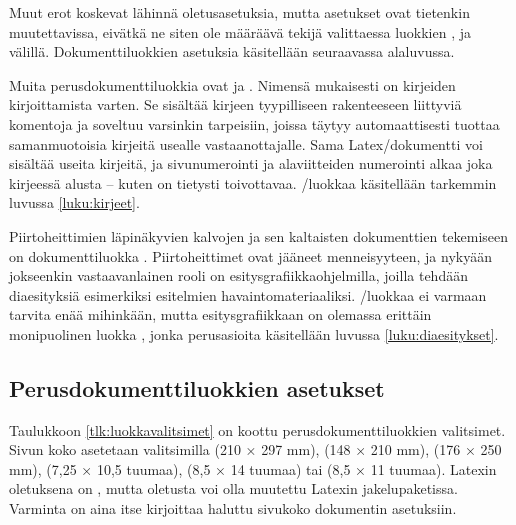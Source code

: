 Muut erot koskevat lähinnä oletusasetuksia, mutta asetukset ovat
tietenkin muutettavissa, eivätkä ne siten ole määräävä tekijä
valittaessa luokkien ,  ja
 välillä. Dokumenttiluokkien asetuksia käsitellään
seuraavassa alaluvussa.

Muita perusdokumenttiluokkia ovat  
ja . Nimensä mukaisesti  on kirjeiden
kirjoittamista varten. Se sisältää kirjeen tyypilliseen rakenteeseen
liittyviä komentoja ja soveltuu varsinkin tarpeisiin, joissa täytyy
automaattisesti tuottaa samanmuotoisia kirjeitä usealle
vas\-taan\-otta\-jalle. Sama Latex\-/dokumentti voi sisältää useita
kirjeitä, ja sivunumerointi ja alaviitteiden numerointi alkaa joka
kirjeessä alusta -- kuten on tietysti toivottavaa.
\-/luokkaa käsitellään tarkemmin luvussa
\ref{luku:kirjeet}.

Piirtoheittimien läpinäkyvien kalvojen ja sen kaltaisten dokumenttien
tekemiseen on dokumenttiluokka . 
Piirtoheittimet ovat jääneet menneisyyteen, ja nykyään jokseenkin
vastaavanlainen rooli on esi\-tys\-gra\-fiikka\-ohjel\-milla, joilla
tehdään dia\-esi\-tyk\-siä esimerkiksi esitelmien havaintomateriaaliksi.
\-/luokkaa ei varmaan tarvita enää mihinkään, mutta
esi\-tys\-gra\-fiik\-kaan on olemassa erittäin monipuolinen luokka
, jonka perus\-asioita käsitellään luvussa
\ref{luku:diaesitykset}.

\subsection{Perusdokumenttiluokkien asetukset}

Taulukkoon \ref{tlk:luokkavalitsimet} on koottu perusdokumenttiluokkien
valitsimet. Sivun koko asetetaan valitsimilla  (210 ×
297 mm),   (148 × 210 mm),
 (176 × 250 mm),  (7,25 ×
10,5 tuumaa),  (8,5 × 14 tuumaa) tai
 (8,5 × 11 tuumaa). Latexin oletuksena on
, mutta oletusta voi olla muutettu Latexin
jakelupaketissa. Varminta on aina itse kirjoittaa haluttu sivukoko
dokumentin asetuksiin.


